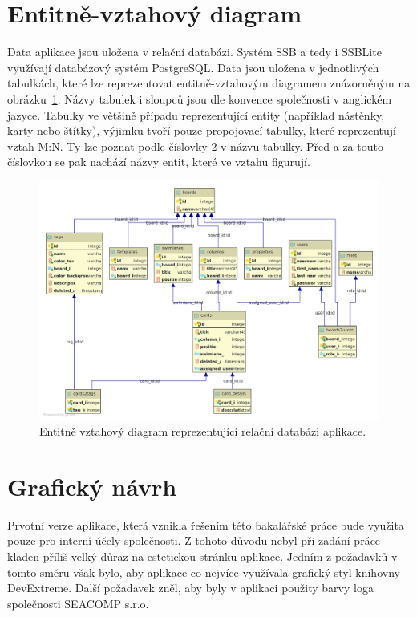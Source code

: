 \section{Entitně-vztahový diagram}\label{sec:erd}
Data aplikace jsou uložena v relační databázi. Systém SSB a tedy i SSBLite využívají databázový systém PostgreSQL. Data jsou uložena v jednotlivých tabulkách, které lze reprezentovat entitně-vztahovým diagramem znázorněným na obrázku~\ref{img:erd}. Názvy tabulek i sloupců jsou dle konvence společnosti v anglickém jazyce. Tabulky ve většině případu reprezentující entity (například nástěnky, karty nebo štítky), výjimku tvoří pouze propojovací tabulky, které reprezentují vztah M:N. Ty lze poznat podle číslovky 2 v názvu tabulky. Před a za touto číslovkou se pak nachází názvy entit, které ve vztahu figurují.

\begin{figure}[H]
	\centering
	\label{img:erd}
	\includegraphics[width=\textwidth]{obrazky-figures/erd.pdf}
	\caption{Entitně vztahový diagram reprezentující relační databázi aplikace.}
\end{figure}


\section{Grafický návrh}
Prvotní verze aplikace, která vznikla řešením této bakalářské práce bude využita pouze pro interní účely společnosti. Z tohoto důvodu nebyl při zadání práce kladen příliš velký důraz na estetickou stránku aplikace. Jedním z požadavků v tomto směru však bylo, aby aplikace co nejvíce využívala grafický styl knihovny DevExtreme. Další požadavek zněl, aby byly v aplikaci použity barvy loga společnosti SEACOMP s.r.o.

